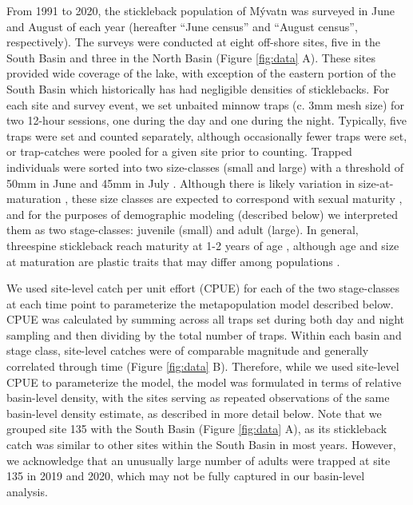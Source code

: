 \documentclass[11pt]{article}
\begin{document}
From 1991 to 2020, 
the stickleback population of M\'{y}vatn was surveyed in June and August of each year
(hereafter ``June census'' and ``August census'', respectively). 
The surveys were conducted at eight off-shore sites, 
five in the South Basin and three in the North Basin
(Figure \ref{fig:data} A).
These sites provided wide coverage of the lake,
with exception of the eastern portion of the South Basin 
which historically has had negligible densities of sticklebacks.
For each site and survey event, 
we set unbaited minnow traps (c. 3mm mesh size) for two 12-hour sessions, 
one during the day and one during the night. 
Typically, five traps were set and counted separately, 
although occasionally fewer traps were set,
or trap-catches were pooled for a given site prior to counting.
Trapped individuals were sorted into two size-classes (small and large)
with a threshold of 50mm in June and 45mm in July \citep{gislason1998}. 
Although there is likely variation in size-at-maturation \citep{singkam2019},
these size classes are expected to correspond with sexual maturity 
\citep{gudmundsson1996, gislason1998},
and for the purposes of demographic modeling (described below) 
we interpreted them as two stage-classes: juvenile (small) and adult (large).
In general, threespine stickleback reach maturity at 1-2 years of age
\citep{baker2008overview},
although age and size at maturation are plastic traits \citep{baker2015life}
that may differ among populations \citep{snyder1991migration}.

We used site-level catch per unit effort (CPUE) for each of the two stage-classes 
at each time point to parameterize the metapopulation model described below. 
CPUE was calculated by summing across all traps set during both day and night sampling
and then dividing by the total number of traps.
Within each basin and stage class, 
site-level catches were of comparable magnitude and 
generally correlated through time (Figure \ref{fig:data} B).
Therefore, while we used site-level CPUE to parameterize the model, 
the model was formulated in terms of relative basin-level density,
with the sites serving as repeated observations of the same basin-level density estimate,
as described in more detail below.
Note that we grouped site 135 with the South Basin (Figure \ref{fig:data} A), 
as its stickleback catch was similar to other sites within the South Basin in most years.
However, 
we acknowledge that an unusually large number of adults were trapped at site 135
in 2019 and 2020, which may not be fully captured in our basin-level analysis.
\end{document}
